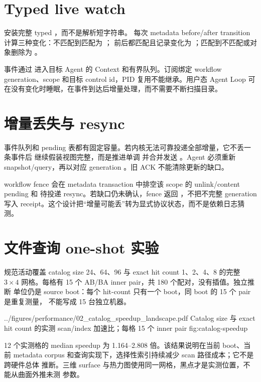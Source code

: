 \section{Typed live watch}

 安装完整 typed ，而不是解析短字符串。
每次 metadata before/after transition 计算三种变化：不匹配到匹配为 ；
前后都匹配且记录变化为 ；匹配到不匹配或对象删除为 。

事件通过  进入目标 Agent 的 Context 和有界队列。订阅绑定
workflow generation、scope 和目标 control id，PID 复用不能继承。用户态 Agent Loop
可在没有变化时睡眠，在事件到达后增量处理，而不需要不断扫描目录。

\section{增量丢失与 resync}

事件队列和 pending 表都有固定容量。若内核无法可靠投递全部增量，它不丢一条事件后
继续假装视图完整，而是推进单调  并合并发送
。Agent 必须重新 snapshot/query，再以对应 generation
。旧 ACK 不能清除更新的缺口。

workflow fence 会在 metadata transaction 中排空该 scope 的 unlink/content pending 和
待投递 resync。若缺口仍未确认，fence 返回 ，不把不完整 generation 写入
receipt。这个设计把“增量可能丢”转为显式协议状态，而不是依赖日志猜测。

\section{文件查询 one-shot 实验}

规范活动覆盖 catalog size 24、64、96 与 exact hit count 1、2、4、8 的完整
$3\times4$ 网格。每格有 15 个 AB/BA inner pair，共 180 个配对，没有插值。独立推断
单位仍是 source boot：每个 hit-count 只有一个 boot，同 boot 的 15 个 pair 是重复测量，
不能写成 15 台独立机器。

  {../figures/performance/02_catalog_speedup_landscape.pdf}
  {Catalog size 与 exact hit count 的实测 scan/index 加速比；每格 15 个 inner pair}
  {fig:catalog-speedup}

12 个实测格的 median speedup 为 1.164--2.808 倍。该结果说明在当前 boot、当前
metadata corpus 和查询实现下，选择性索引持续减少 scan 路径成本；它不是跨硬件总体
推断。三维 surface 与热力图使用同一网格，黑点才是实测位置，不能从曲面外推未测
参数。

